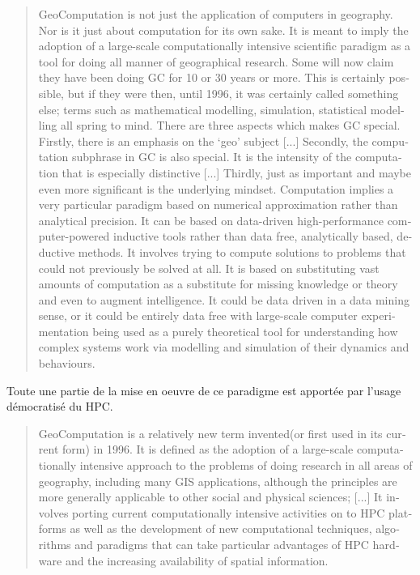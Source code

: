 \foreignblockquote{english}[{\cite[4]{Openshaw2000b}}]{GeoComputation is not just the application of computers in geography. Nor is it just about computation for its own sake. It is meant to imply the adoption of a large-scale computationally intensive scientific paradigm as a tool for doing all manner of geographical research. Some will now claim they have been doing GC for 10 or 30 years or more. This is certainly possible, but if they were then, until 1996, it was certainly called something else; terms such as mathematical modelling, simulation, statistical modelling all spring to mind. There are three aspects which makes GC special. Firstly, there is an emphasis on the ‘geo’ subject [...] Secondly, the computation subphrase in GC is also special. It is the intensity of the computation that is especially distinctive [...] Thirdly, just as important and maybe even more significant is the underlying mindset. Computation implies a very particular paradigm based on numerical approximation rather than analytical precision. It can be based on data-driven high-performance computer-powered inductive tools rather than data free, analytically based, deductive methods. It involves trying to compute solutions to problems that could not previously be solved at all. It is based on substituting vast amounts of  computation as a substitute for missing knowledge or theory and even to augment intelligence. It could be data driven in a data mining sense, or it could be entirely data free with large-scale computer experimentation being used as a purely theoretical tool for understanding how complex systems work via modelling and simulation of their dynamics and behaviours. }

Toute une partie de la mise en oeuvre de ce paradigme est apportée par l'usage démocratisé du HPC.

\foreignblockquote{english}[{\cite[17]{Openshaw2000}}]{GeoComputation is a relatively new term invented(or first used in its current form) in 1996. It is defined as the adoption of a large-scale computationally intensive approach to the problems of doing research in all areas of geography, including many GIS applications, although the principles are more generally applicable to other social and physical sciences; [...] It involves porting current computationally intensive activities on to HPC platforms as well as the development of new computational techniques, algorithms and paradigms that can take particular advantages of HPC hardware and the increasing availability of spatial information.}

